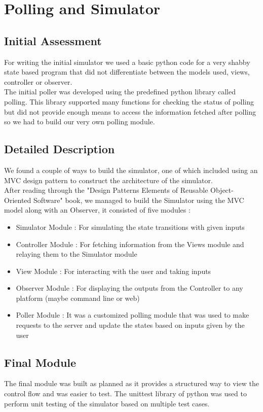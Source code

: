 \section{Polling and Simulator}
\subsection{Initial Assessment}
{\normalsize For writing the initial simulator we used a basic python code for a very shabby state based program that did not differentiate between the models used, views, controller or observer. \\[0.1in]

The initial poller was developed using the predefined python library called polling. This library supported many functions for checking the status of polling but did not provide enough means to access the information fetched after polling so we had to build our very own polling module.
}
\subsection{Detailed Description}
{\normalsize We found a couple of ways to build the simulator, one of which included using an MVC design pattern to construct the architecture of the simulator. \\[0.1in]
After reading through the "Design Patterns Elements of Reusable Object-Oriented Software" book, we managed to build the Simulator using the MVC model along with an Observer, it consisted of five modules : 
\begin{itemize}
    \item Simulator Module : For simulating the state transitions with given inputs
    \item Controller Module : For fetching information from the Views module and relaying them to the Simulator module
    \item View Module : For interacting with the user and taking inputs
    \item Observer Module : For displaying the outputs from the Controller to any platform (maybe command line or web)
    \item Poller Module : It was a customized polling module that was used to make requests to the server and update the states based on inputs given by the user
\end{itemize}
}
\subsection{Final Module}
{\normalsize The final module was built as planned as it provides a structured way to view the control flow and was easier to test. The unittest library of python was used to perform unit testing of the simulator based on multiple test cases.
}
